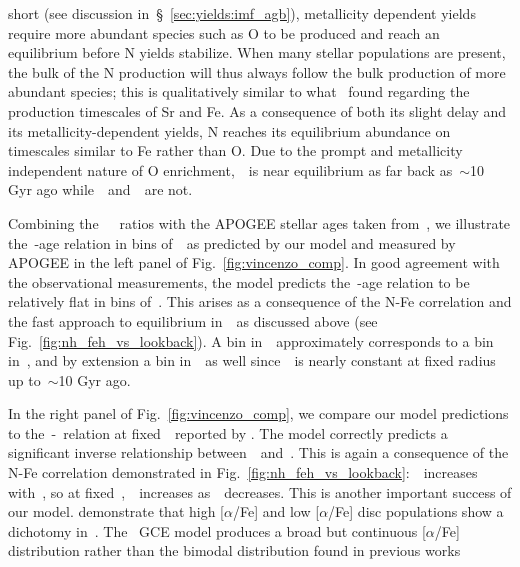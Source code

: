 \documentclass[ms.tex]{subfiles}
\begin{document}
short (see discussion in~\S~\ref{sec:yields:imf_agb}), metallicity dependent
yields require more abundant species such as O to be produced and reach an
equilibrium before N yields stabilize.
When many stellar populations are present, the bulk of the N production will
thus always follow the bulk production of more abundant species; this is 
qualitatively similar to what~\citet{Johnson2020} found regarding the
production timescales of Sr and Fe.
As a consequence of both its slight delay and its metallicity-dependent
yields, N reaches its equilibrium abundance on timescales similar to Fe rather
than O.
Due to the prompt and metallicity independent nature of O enrichment,~\oh~is
near equilibrium as far back as~$\sim$10 Gyr ago while~\nh~and~\feh~are not.
\par
Combining the~\citet{Vincenzo2021}~\no~ratios with the APOGEE stellar ages
taken from~\citet{Miglio2021}, we illustrate the~\no-age relation in bins
of~\feh~as predicted by our model and measured by APOGEE in the left panel of
Fig.~\ref{fig:vincenzo_comp}.
In good agreement with the observational measurements, the model predicts
the~\no-age relation to be relatively flat in bins of~\feh.
This arises as a consequence of the N-Fe correlation and the fast approach to
equilibrium in~\oh~as discussed above (see Fig.~\ref{fig:nh_feh_vs_lookback}).
A bin in~\feh~approximately corresponds to a bin in~\nh, and by extension a bin
in~\no~as well since~\oh~is nearly constant at fixed radius up to~$\sim$10 Gyr
ago.
\par
In the right panel of Fig.~\ref{fig:vincenzo_comp}, we compare our model
predictions to the~\no-\ofe~relation at fixed~\oh~reported by
\citet{Vincenzo2021}.
The model correctly predicts a significant inverse relationship
between~\no~and~\ofe.
This is again a consequence of the N-Fe correlation demonstrated in
Fig.~\ref{fig:nh_feh_vs_lookback}:~\nh~increases with~\feh, so at
fixed~\oh,~\no~increases as~\ofe~decreases.
This is another important success of our model.
\citet{Vincenzo2021} demonstrate that high [$\alpha$/Fe] and low [$\alpha$/Fe]
disc populations show a dichotomy in~\no.
The~\citet{Johnson2021} GCE model produces a broad but continuous [$\alpha$/Fe]
distribution rather than the bimodal distribution found in previous works
\end{document}
